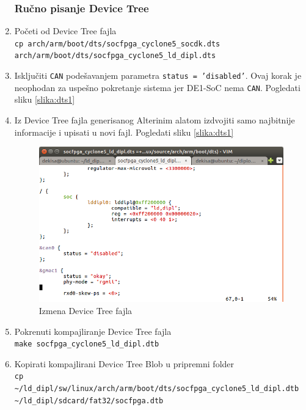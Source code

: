 \begin{enumerate}
\subsubsection*{Ručno pisanje Device Tree}
\item Početi od Device Tree fajla\\
\texttt{cp arch/arm/boot/dts/socfpga\_cyclone5\_socdk.dts \\arch/arm/boot/dts/socfpga\_cyclone5\_ld\_dipl.dts}
\item Isključiti \texttt{CAN} podešavanjem parametra \texttt{status = 'disabled'}. Ovaj korak je neophodan za uspešno pokretanje sistema jer DE1-SoC nema \texttt{CAN}. Pogledati sliku \ref{slika:dts1}
\item Iz Device Tree fajla generisanog Alterinim alatom izdvojiti samo najbitnije informacije i upisati u novi fajl. Pogledati sliku \ref{slika:dts1}
\begin{figure}[h!]
\centering
\includegraphics[scale=0.6,trim={0 15 10 60},clip]{img/dts1.png}
\caption{Izmena Device Tree fajla}
\label{slika:uboot1}
\end{figure}
\item Pokrenuti kompajliranje Device Tree fajla\\
\texttt{make socfpga\_cyclone5\_ld\_dipl.dtb}
\item Kopirati kompajlirani Device Tree Blob u pripremni folder\\
\texttt{cp \textasciitilde/ld\_dipl/sw/linux/arch/arm/boot/dts/socfpga\_cyclone5\_ld\_dipl.dtb \\ \textasciitilde/ld\_dipl/sdcard/fat32/socfpga.dtb }



\end{enumerate}
